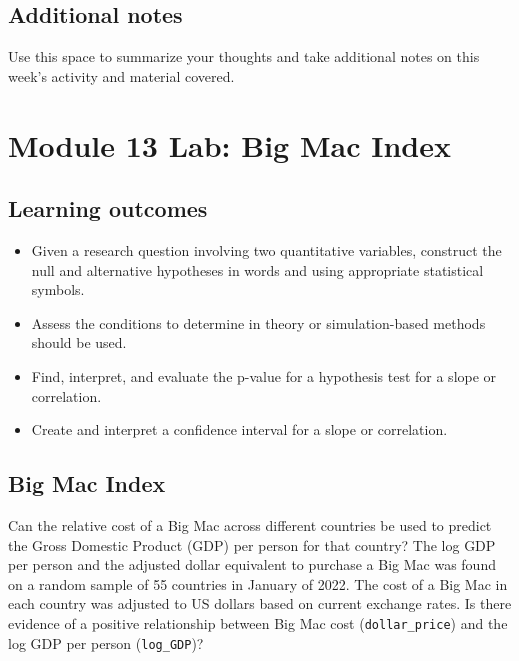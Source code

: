 \documentclass[
]{report}
\begin{document}
\subsection{Additional notes}\label{additional-notes-28}

Use this space to summarize your thoughts and take additional notes on this week's activity and material covered.

\newpage

\section{Module 13 Lab: Big Mac Index}\label{module-13-lab-big-mac-index}


\subsection{Learning outcomes}\label{learning-outcomes-34}

\begin{itemize}
\item
  Given a research question involving two quantitative variables, construct the null and alternative hypotheses
  in words and using appropriate statistical symbols.
\item
  Assess the conditions to determine in theory or simulation-based methods should be used.
\item
  Find, interpret, and evaluate the p-value for a hypothesis test for a slope or correlation.
\item
  Create and interpret a confidence interval for a slope or correlation.
\end{itemize}

\subsection{Big Mac Index}\label{big-mac-index}

Can the relative cost of a Big Mac across different countries be used to predict the Gross Domestic Product (GDP) per person for that country? The log GDP per person and the adjusted dollar equivalent to purchase a Big Mac was found on a random sample of 55 countries in January of 2022. The cost of a Big Mac in each country was adjusted to US dollars based on current exchange rates. Is there evidence of a positive relationship between Big Mac cost (\texttt{dollar\_price}) and the log GDP per person (\texttt{log\_GDP})?
\end{document}
